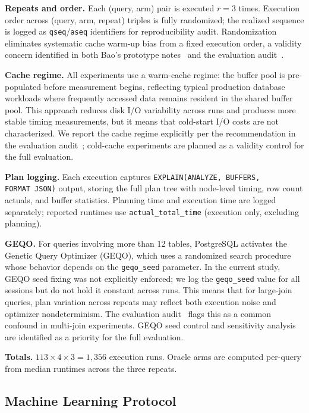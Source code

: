 \documentclass[sigconf,natbib=false]{article}
\newcommand{\postgres}{PostgreSQL}
\begin{document}
\textbf{Repeats and order.} Each (query, arm) pair is executed $r=3$ times. Execution order
across (query, arm, repeat) triples is fully randomized; the realized sequence is logged as
\texttt{qseq}/\texttt{aseq} identifiers for reproducibility audit. Randomization eliminates
systematic cache warm-up bias from a fixed execution order, a validity concern identified in
both Bao's prototype notes~\cite{Marcus2021Bao} and the evaluation audit~\cite{Lehmann2024}.

\textbf{Cache regime.} All experiments use a warm-cache regime: the buffer pool is
pre-populated before measurement begins, reflecting typical production database workloads
where frequently accessed data remains resident in the shared buffer pool. This approach
reduces disk I/O variability across runs and produces more stable timing measurements, but
it means that cold-start I/O costs are not characterized. We report the cache regime
explicitly per the recommendation in the evaluation audit~\cite{Lehmann2024}; cold-cache
experiments are planned as a validity control for the full evaluation.

\textbf{Plan logging.} Each execution captures \texttt{EXPLAIN}\linebreak\texttt{(ANALYZE, BUFFERS, FORMAT~JSON)}
output, storing the full plan tree with node-level timing, row count actuals, and buffer
statistics. Planning time and execution time are logged separately; reported runtimes use
\texttt{actual\_total\_time} (execution only, excluding planning).

\textbf{GEQO.} For queries involving more than 12 tables, \postgres{} activates the
Genetic Query Optimizer (GEQO), which uses a randomized search procedure whose behavior
depends on the \texttt{geqo\_seed} parameter. In the current study, GEQO seed fixing was
not explicitly enforced; we log the \texttt{geqo\_seed} value for all sessions but do not
hold it constant across runs. This means that for large-join queries, plan variation across
repeats may reflect both execution noise and optimizer nondeterminism. The evaluation
audit~\cite{Lehmann2024} flags this as a common confound in multi-join experiments. GEQO
seed control and sensitivity analysis are identified as a priority for the full evaluation.

\textbf{Totals.} $113 \times 4 \times 3 = 1{,}356$ execution runs. Oracle arms are computed
per-query from median runtimes across the three repeats.

\subsection{Machine Learning Protocol}
\end{document}

